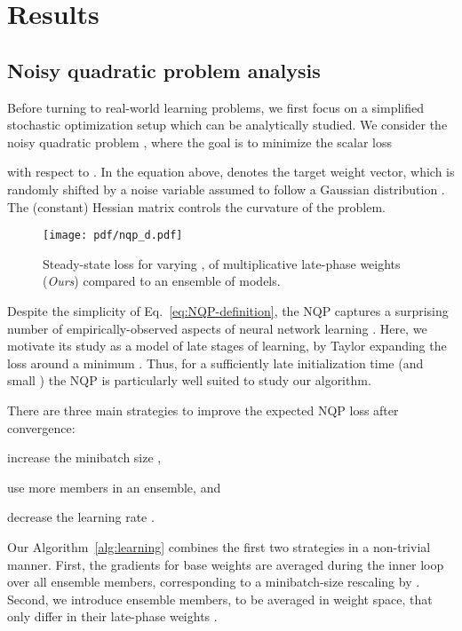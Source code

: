 \documentclass{article} \usepackage{iclr2021_conference,times}
\begin{document}
\section{Results}

\subsection{Noisy quadratic problem analysis}
Before turning to real-world learning problems, we first focus on a simplified stochastic optimization setup which can be analytically studied. We consider the noisy quadratic problem \citep[NQP;][]{schaul_no_2013,martens_second-order_2016,wu_understanding_2018,zhang_which_2019,zhang_lookahead_2019}, where the goal is to minimize the scalar loss

with respect to . In the equation above,  denotes the target weight vector, which is randomly shifted by a noise variable  assumed to follow a Gaussian distribution . The (constant) Hessian matrix  controls the curvature of the problem.

\begin{wrapfigure}[13]{r}{0.43\textwidth}
  \vspace{-10pt}
  \begin{center}
    \texttt{[image: pdf/nqp\_d.pdf]}
  \end{center}
  \vspace{-15pt}
  \caption{Steady-state loss for varying , of multiplicative late-phase weights (\emph{Ours}) compared to an ensemble of models. \label{fig:NQP-main-results}}
\end{wrapfigure}
Despite the simplicity of Eq.~\ref{eq:NQP-definition}, the NQP captures a surprising number of empirically-observed aspects of neural network learning \citep{zhang_which_2019}. Here, we motivate its study as a model of late stages of learning, by Taylor expanding the loss around a minimum . Thus, for a sufficiently late initialization time  (and small ) the NQP is particularly well suited to study our algorithm.


There are three main strategies to improve the expected NQP loss after convergence:
\begin{enumerate*}[label=(\itshape\roman*)]
  \item increase the minibatch size ,
  \item use more members  in an ensemble, and
  \item decrease the learning rate  \citep{zhang_which_2019}.
\end{enumerate*}
Our Algorithm~\ref{alg:learning} combines the first two strategies in a non-trivial manner. First, the gradients for base weights  are averaged during the inner loop over all ensemble members, corresponding to a minibatch-size rescaling by . Second, we introduce  ensemble members, to be averaged in weight space, that only differ in their late-phase weights .
\end{document}
